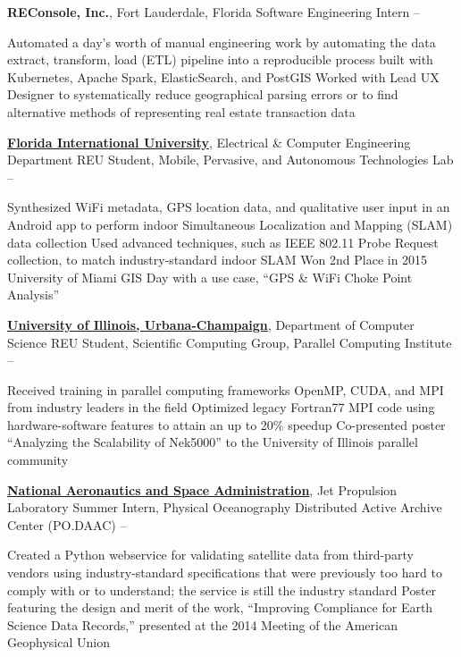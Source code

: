 \documentclass[letterpaper,MMMyyyy,nonstopmode]{simpleresumecv}
\begin{document}
\begin{Body}
\Entry
\textbf{REConsole, Inc.}, Fort Lauderdale, Florida
\Gap
\BulletItem
Software Engineering Intern
\hfill
{} -- 
\begin{Detail}
\SubBulletItem Automated a day's worth of manual engineering work by automating the data extract, transform, load (ETL) pipeline into a reproducible process built with Kubernetes, Apache Spark, ElasticSearch, and PostGIS
\SubBulletItem Worked with Lead UX Designer to systematically reduce geographical parsing errors or to find alternative methods of representing real estate transaction data
\end{Detail}

\Entry
\href{http://www.fiu.edu/}{\textbf{Florida International University}}, Electrical \& Computer Engineering Department
\Gap
\BulletItem REU Student, Mobile, Pervasive, and Autonomous Technologies Lab
\hfill {} -- 
\begin{Detail}
\SubBulletItem Synthesized WiFi metadata, GPS location data, and qualitative user input in an Android app to perform indoor Simultaneous Localization and Mapping (SLAM) data collection
\SubBulletItem Used advanced techniques, such as IEEE 802.11 Probe Request collection, to match industry-standard indoor SLAM
\SubBulletItem Won 2nd Place in 2015 University of Miami GIS Day with a use case, ``GPS \& WiFi Choke Point Analysis''
\end{Detail}

\Entry
\href{http://illinois.edu/}{\textbf{University of Illinois, Urbana-Champaign}}, Department of Computer Science
\Gap
\BulletItem REU Student, Scientific Computing Group, Parallel Computing Institute
\hfill {} -- 
\begin{Detail}
\SubBulletItem Received training in parallel computing frameworks OpenMP, CUDA, and MPI from industry leaders in the field
\SubBulletItem Optimized legacy Fortran77 MPI code using hardware-software features to attain an up to 20\% speedup
\SubBulletItem Co-presented poster ``Analyzing the Scalability of Nek5000'' to the University of Illinois parallel community
\end{Detail}

\Entry
\href{http://www.jpl.nasa.gov/}{\textbf{National Aeronautics and Space Administration}}, Jet Propulsion Laboratory
\Gap
\BulletItem Summer Intern, Physical Oceanography Distributed Active Archive Center (PO.DAAC)
\hfill
{} -- 
\begin{Detail}
\SubBulletItem Created a Python webservice for validating satellite data from third-party vendors using industry-standard specifications that were previously too hard to comply with or to understand; the service is still the industry standard
\SubBulletItem Poster featuring the design and merit of the work, ``Improving Compliance for Earth Science Data Records,'' presented at the 2014 Meeting of the American Geophysical Union
\end{Detail}


\end{Body}
\end{document}
